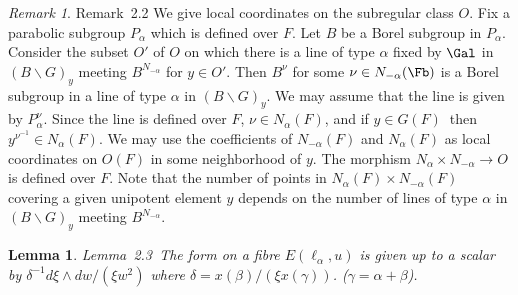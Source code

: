 \documentclass{memo-l}
\newtheorem{lemma}[theorem]{Lemma}
\theoremstyle{definition}
\theoremstyle{remark}
\newtheorem{remark}[theorem]{Remark}
\numberwithin{section}{chapter}
\numberwithin{equation}{chapter}
\begin{document}
\begin{remark}{Remark\ 2.2} We give local coordinates on the subregular
class $O$.  Fix a parabolic subgroup $P_{{\alpha}}$ which is defined over
$F$.  Let $B$ be a Borel subgroup in $P_{{\alpha}}$.  Consider the subset
$O'$ of $O$ on which there is a line of type ${\alpha}$ fixed by $\Gal$
in $(B\backslash G)_{y}$ meeting $B^{N_{-{\alpha}}}$ for $y
\in O'$.  Then $B^{{\nu}}$ for some ${\nu} \in N_{-{\alpha}}(\Fb)$
is a Borel subgroup in a line of type ${\alpha}$ in $(B\backslash
G)_{y}$.  We may assume that the line is given by
$P_{{\alpha}}^{{\nu}}$.  Since the line is defined over $F$, ${\nu} \in
N_{{\alpha}}(F)$, and if $y \in G(F)\ $ then  $y^{\nu^{-1}} \in
N_{{\alpha}}(F)$.  We may use the coefficients of $N_{-{\alpha}}(F)$ and
$N_{{\alpha}}(F)$ as local coordinates on $O(F)$ in some neighborhood of
$y$.  The morphism $N_{{\alpha}} \times N_{-{\alpha}} {\to} O$ is defined
over $F$.  Note that the number of points in $N_{{\alpha}}(F) \times
N_{-{\alpha}}(F)$ covering a given unipotent element $y$ depends on the
number of lines of type ${\alpha}$ in $(B\backslash G)_{y}$ meeting
$B^{N_{-{\alpha}}}.$
\end{remark}

\medpagebreak

\begin{lemma}{Lemma\ 2.3}\  The form on a fibre $E({\ell}_{{\alpha}},u)$ is
given up to a scalar by ${\delta}^{-1}d{\xi}\wedge dw/({\xi}w^{2})$ where
${\delta} = x({\beta})/({\xi}x({\gamma}))$. ($\gamma=\alpha+\beta$).
\end{lemma}
\end{document}
